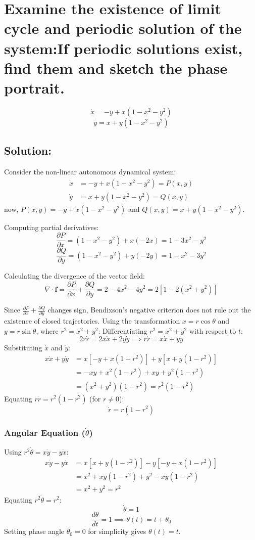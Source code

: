\section{Examine the existence of limit cycle and periodic solution of the system:If periodic solutions exist, find them and sketch the phase portrait.}
$$\dot{x} = -y + x(1 - x^2 - y^2)$$$$\dot{y} = x + y(1 - x^2 - y^2)$$
\subsection*{Solution:}
Consider the non-linear autonomous dynamical system:
\begin{align*}
    \dot{x} &= -y + x(1 - x^2 - y^2)=P(x,y) \\
    \dot{y} &= x + y(1 - x^2 - y^2)=Q(x,y)
\end{align*}
now, $P(x, y) = -y + x(1 - x^2 - y^2)$ and $Q(x, y) = x + y(1 - x^2 - y^2)$.

\noindent Computing partial derivatives:
\[
\frac{\partial P}{\partial x} = (1 - x^2 - y^2) + x(-2x) = 1 - 3x^2 - y^2
\]
\[
\frac{\partial Q}{\partial y} = (1 - x^2 - y^2) + y(-2y) = 1 - x^2 - 3y^2
\]

\noindent Calculating the divergence of the vector field:
\[
\nabla \cdot \mathbf{f} = \frac{\partial P}{\partial x} + \frac{\partial Q}{\partial y} = 2 - 4x^2 - 4y^2 = 2 \left[ 1 - 2(x^2 + y^2) \right]
\]

\noindent Since $\frac{\partial P}{\partial x} + \frac{\partial Q}{\partial y}$ changes sign, Bendixson's negative criterion does not rule out the existence of closed trajectories.
Using the transformation $x = r \cos\theta$ and $y = r \sin\theta$, where $r^2 = x^2 + y^2$:
Differentiating $r^2 = x^2 + y^2$ with respect to $t$:
\[
2r\dot{r} = 2x\dot{x} + 2y\dot{y} \implies r\dot{r} = x\dot{x} + y\dot{y}
\]
Substituting $\dot{x}$ and $\dot{y}$:
\begin{align*}
    x\dot{x} + y\dot{y} &= x \left[ -y + x(1 - r^2) \right] + y \left[ x + y(1 - r^2) \right] \\
    &= -xy + x^2(1 - r^2) + xy + y^2(1 - r^2) \\
    &= (x^2 + y^2)(1 - r^2) = r^2(1 - r^2)
\end{align*}
Equating $r\dot{r} = r^2(1 - r^2)$ (for $r \neq 0$):
\[
\dot{r} = r(1 - r^2)
\]

\subsubsection*{ Angular Equation ($\dot{\theta}$)}
Using $r^2 \dot{\theta} = x\dot{y} - y\dot{x}$:
\begin{align*}
    x\dot{y} - y\dot{x} &= x \left[ x + y(1 - r^2) \right] - y \left[ -y + x(1 - r^2) \right] \\
    &= x^2 + xy(1 - r^2) + y^2 - xy(1 - r^2) \\
    &= x^2 + y^2 = r^2
\end{align*}
Equating $r^2 \dot{\theta} = r^2$:
\[
\dot{\theta} = 1
\]
\[
\frac{d\theta}{dt} = 1 \implies \theta(t) = t + \theta_0
\]
Setting phase angle $\theta_0 = 0$ for simplicity gives $\theta(t) = t$.

